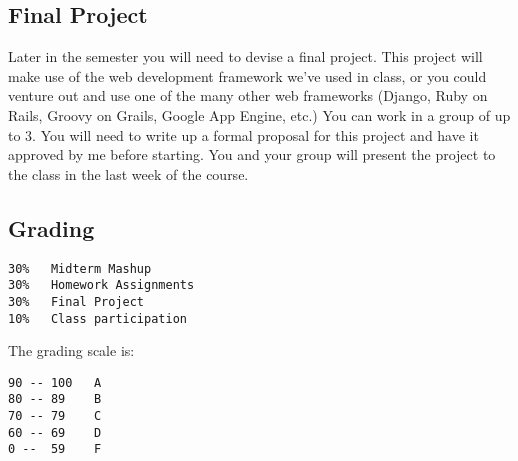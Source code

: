 \documentclass[11pt,twocolumn]{article}
\begin{document}
\subsection{Final Project} %
\label{sub:final_project}
Later in the semester you will need to devise a final project.  This project will make use of the web development framework we've used in class, or you could venture out and use one of the many other web frameworks (Django, Ruby on Rails, Groovy on Grails, Google App Engine, etc.)  You can work in a group of up to 3.  You will need to write up a formal proposal for this project and have it approved by me before starting.  You and your group will present the project to the class in the last week of the course.

\subsection*{Grading}


\begin{verbatim}
30%   Midterm Mashup
30%   Homework Assignments
30%   Final Project
10%   Class participation
\end{verbatim}

The grading scale is:

\begin{verbatim}
90 -- 100   A
80 -- 89    B
70 -- 79    C
60 -- 69    D
0 --  59    F
\end{verbatim}
\end{document}
